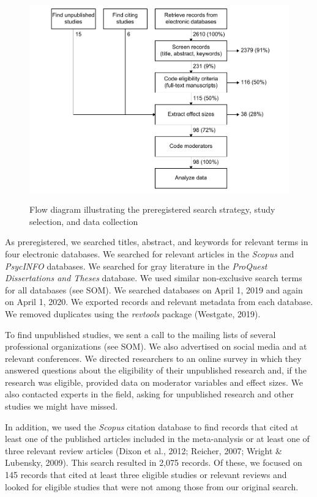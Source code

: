 \documentclass[12pt, letterpaper]{article}
\begin{document}
\begin{figure}[t!]
\centering
\caption{Flow diagram illustrating the preregistered search strategy, study selection, and data collection}
\includegraphics[scale=1]{../figures/figure-1}
\label{fig:f1}
\end{figure}

As preregistered, we searched titles, abstract, and keywords for
relevant terms in four electronic databases. We searched for relevant
articles in the \emph{Scopus} and \emph{PsycINFO} databases. We searched
for gray literature in the \emph{ProQuest Dissertations and Theses}
database. We used similar non-exclusive search terms for all databases
(see SOM). We searched databases on April 1, 2019 and again on April 1,
2020. We exported records and relevant metadata from each database. We
removed duplicates using the \emph{revtools} package (Westgate, 2019).

To find unpublished studies, we sent a call to the mailing lists of
several professional organizations (see SOM). We also advertised on
social media and at relevant conferences. We directed researchers to an
online survey in which they answered questions about the eligibility of
their unpublished research and, if the research was eligible, provided
data on moderator variables and effect sizes. We also contacted experts
in the field, asking for unpublished research and other studies we might
have missed.

In addition, we used the \emph{Scopus} citation database to find records
that cited at least one of the published articles included in the
meta-analysis or at least one of three relevant review articles (Dixon
et al., 2012; Reicher, 2007; Wright \& Lubensky, 2009). This search
resulted in 2,075 records. Of these, we focused on 145 records that
cited at least three eligible studies or relevant reviews and looked for
eligible studies that were not among those from our original search.
\end{document}

